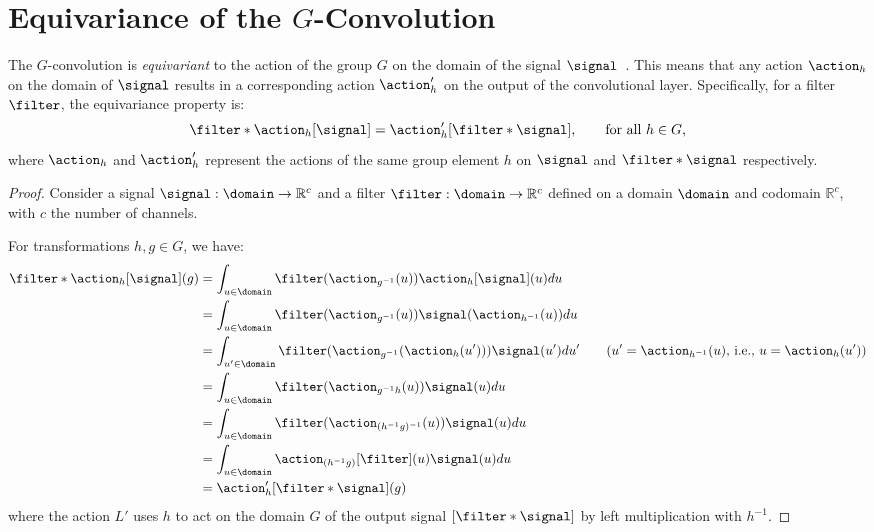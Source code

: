 
\section{Equivariance of the $G$-Convolution}\label{sec:g-conv}


The $G$-convolution is \textit{equivariant} to the action of the group $G$ on the domain of the signal $\signal$~\cite{cohen2016group}. This means that any action $\action_h$ on the domain of $\signal$ results in a corresponding action $\action'_h$ on the output of the convolutional layer. Specifically, for a filter $\filter $, the equivariance property is:
\begin{equation}
    \filter * \action_{h}[\signal] = \action'_{h}[\filter * \signal], \qquad \text{for all ${h} \in G$,}
\end{equation}
where $\action_h$ and $\action'_h$ represent the actions of the same group element $h$ on $\signal$ and $\filter * \signal$ respectively.



\begin{proof}
Consider a signal $\signal: \domain \rightarrow \mathbb{R}^c$ and a filter $\filter: \domain \rightarrow \mathbb{R}^c$ defined on a domain $\domain$ and codomain $\mathbb{R}^c$, with $c$ the number of channels.

For transformations $h, g \in G$, we have:
\begin{align*}
    \filter * \action_{h}[\signal](g)
        &= \int_{u \in \domain}
            \filter(\action_{g^{-1}}(u)) \action_{h}[\signal](u) du \\
        &= \int_{u \in \domain}
            \filter(\action_{g^{-1}}(u))\signal( \action_{h^{-1}}(u)) du \\
        &= \int_{u' \in \domain}
            \filter(\action_{g^{-1}}(\action_{h}(u')))\signal(u') du'
            \qquad
            \text{($u' =  \action_{h^{-1}}(u)$, i.e., $u = \action_{h}(u')$)} \\
        &= \int_{u \in \domain}
            \filter(\action_{g^{-1}h}(u))\signal(u) du \\
        &= \int_{u \in \domain}
            \filter(\action_{(h^{-1}g)^{-1}}(u))\signal(u) du \\
        &= \int_{u \in \domain}
            \action_{(h^{-1}g)}[\filter](u)\signal(u) du \\
        &=\action'_{h}[\filter * \signal](g)
\end{align*}
where the action $L'$ uses $h$ to act on the domain $G$ of the output signal  $[\filter * \signal]$ by left multiplication with $h^{-1}$.
\end{proof}

